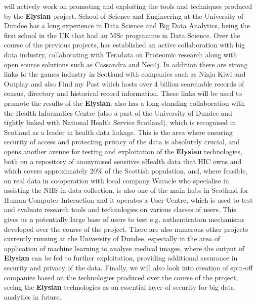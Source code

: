 \documentclass[a4paper,11pt]{article}
\newcommand{\project}[1]{\textbf{#1}\xspace}
\newcommand{\SECURITY}{\project{Elysian}}
\newcommand{\TheProject}{\SECURITY}
\begin{document}
\UODshort{} will actively work on promoting and exploiting the tools and techniques produced by the \TheProject{} project. School of Science and Engineering at the University of Dundee has a long experience in Data Science and Big Data Analytics, being the first school in the UK that had an MSc programme in Data Science. Over the course of the previous projects, \UOD has established an active collaboration with big data industry, collaborating with Teradata  on Proteomic research along with open source solutions such as Cassandra and Neo4j. In addition there are strong links to the games industry in Scotland with companies such as Ninja Kiwi and Outplay and also Find my Past which hosts over 4 billion searchable records of census, directory and historical record information. These links will be used to promote the results of the \TheProject{}. \UOD also has a long-standing collaboration with the Health Informatics Centre (also a part of the University of Dundee and tightly linked with National Health Service Scotland), which is recognised in Scotland as a leader in health data linkage. This is the area where ensuring security of access and protecting privacy of the data is absolutely crucial, and opens another avenue for testing and exploitation of the \TheProject{} technologies, both on a repository of anonymised sensitive eHealth data that HIC owns and which covers approximately 20\% of the Scottish population, and, where feasible, on real data in co-operation with local company Waracle who specialise in assisting the NHS in data collection. \UODshort{} is also one of the main hubs in Scotland for Human-Computer Interaction and it operates a User Centre, which is used to test and evaluate research tools and technologies on various classes of users. This gives us a potentially large base of users to test e.g. authentication mechanisms developed over the course of the project. There are also numerous other projects currently running at the University of Dundee, especially in the area of application of machine learning to analyse medical images, where the output of \TheProject{} can be fed to further exploitation, providing additional assurance in security and privacy of the data. Finally, we will also look into creation of spin-off companies based on the technologies produced over the course of the project, seeing the \TheProject{} technologies as an essential layer of security for big data analytics in future.
\end{document}
